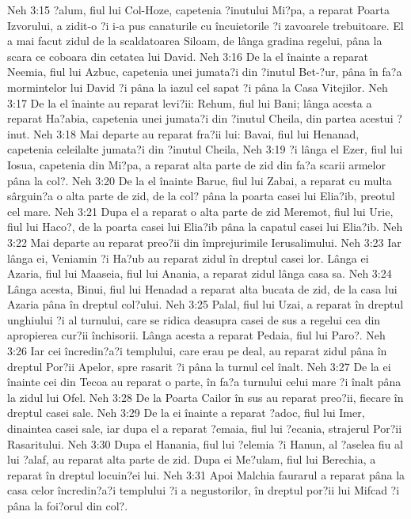 Neh 3:15  ?alum, fiul lui Col-Hoze, capetenia ?inutului Mi?pa, a reparat Poarta Izvorului, a zidit-o ?i i-a pus canaturile cu încuietorile ?i zavoarele trebuitoare. El a mai facut zidul de la scaldatoarea Siloam, de lânga gradina regelui, pâna la scara ce coboara din cetatea lui David.
Neh 3:16  De la el înainte a reparat Neemia, fiul lui Azbuc, capetenia unei jumata?i din ?inutul Bet-?ur, pâna în fa?a mormintelor lui David ?i pâna la iazul cel sapat ?i pâna la Casa Vitejilor.
Neh 3:17  De la el înainte au reparat levi?ii: Rehum, fiul lui Bani; lânga acesta a reparat Ha?abia, capetenia unei jumata?i din ?inutul Cheila, din partea acestui ?inut.
Neh 3:18  Mai departe au reparat fra?ii lui: Bavai, fiul lui Henanad, capetenia celeilalte jumata?i din ?inutul Cheila,
Neh 3:19  ?i lânga el Ezer, fiul lui Iosua, capetenia din Mi?pa, a reparat alta parte de zid din fa?a scarii armelor pâna la col?.
Neh 3:20  De la el înainte Baruc, fiul lui Zabai, a reparat cu multa sârguin?a o alta parte de zid, de la col? pâna la poarta casei lui Elia?ib, preotul cel mare.
Neh 3:21  Dupa el a reparat o alta parte de zid Meremot, fiul lui Urie, fiul lui Haco?, de la poarta casei lui Elia?ib pâna la capatul casei lui Elia?ib.
Neh 3:22  Mai departe au reparat preo?ii din împrejurimile Ierusalimului.
Neh 3:23  Iar lânga ei, Veniamin ?i Ha?ub au reparat zidul în dreptul casei lor. Lânga ei Azaria, fiul lui Maaseia, fiul lui Anania, a reparat zidul lânga casa sa.
Neh 3:24  Lânga acesta, Binui, fiul lui Henadad a reparat alta bucata de zid, de la casa lui Azaria pâna în dreptul col?ului.
Neh 3:25  Palal, fiul lui Uzai, a reparat în dreptul unghiului ?i al turnului, care se ridica deasupra casei de sus a regelui cea din apropierea cur?ii închisorii. Lânga acesta a reparat Pedaia, fiul lui Paro?.
Neh 3:26  Iar cei încredin?a?i templului, care erau pe deal, au reparat zidul pâna în dreptul Por?ii Apelor, spre rasarit ?i pâna la turnul cel înalt.
Neh 3:27  De la ei înainte cei din Tecoa au reparat o parte, în fa?a turnului celui mare ?i înalt pâna la zidul lui Ofel.
Neh 3:28  De la Poarta Cailor în sus au reparat preo?ii, fiecare în dreptul casei sale.
Neh 3:29  De la ei înainte a reparat ?adoc, fiul lui Imer, dinaintea casei sale, iar dupa el a reparat ?emaia, fiul lui ?ecania, strajerul Por?ii Rasaritului.
Neh 3:30  Dupa el Hanania, fiul lui ?elemia ?i Hanun, al ?aselea fiu al lui ?alaf, au reparat alta parte de zid. Dupa ei Me?ulam, fiul lui Berechia, a reparat în dreptul locuin?ei lui.
Neh 3:31  Apoi Malchia faurarul a reparat pâna la casa celor încredin?a?i templului ?i a negustorilor, în dreptul por?ii lui Mifcad ?i pâna la foi?orul din col?.

